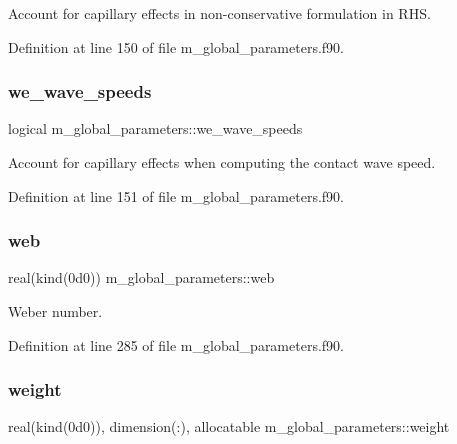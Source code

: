 Account for capillary effects in non-\/conservative formulation in R\+HS. 



Definition at line 150 of file m\+\_\+global\+\_\+parameters.\+f90.

\mbox{\label{namespacem__global__parameters_afe755241e6fe1e3a132aec6feab74ae4}} 
\subsubsection{\texorpdfstring{we\+\_\+wave\+\_\+speeds}{we\_wave\_speeds}}
{\footnotesize\ttfamily logical m\+\_\+global\+\_\+parameters\+::we\+\_\+wave\+\_\+speeds}



Account for capillary effects when computing the contact wave speed. 



Definition at line 151 of file m\+\_\+global\+\_\+parameters.\+f90.

\mbox{\label{namespacem__global__parameters_af2ed21959a90158c2459574230cdfcff}} 
\subsubsection{\texorpdfstring{web}{web}}
{\footnotesize\ttfamily real(kind(0d0)) m\+\_\+global\+\_\+parameters\+::web}



Weber number. 



Definition at line 285 of file m\+\_\+global\+\_\+parameters.\+f90.

\mbox{\label{namespacem__global__parameters_a121ed97f0ae913d37bce5bbf1c7b2cc2}} 
\subsubsection{\texorpdfstring{weight}{weight}}
{\footnotesize\ttfamily real(kind(0d0)), dimension(\+:), allocatable m\+\_\+global\+\_\+parameters\+::weight}



